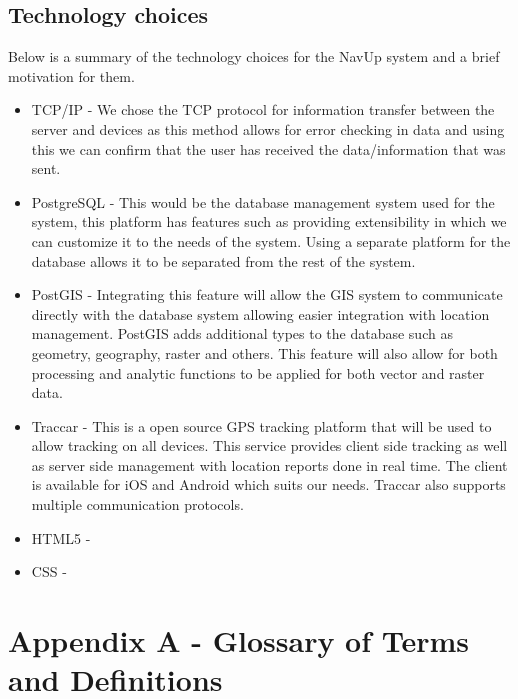 \documentclass{article}
\begin{document}
\subsection{Technology choices}
Below is a summary of the technology choices for the NavUp system and a brief motivation for them.
\begin{itemize}
  \item TCP/IP - We chose the TCP protocol for information transfer between the server and devices as this method allows for error checking in data and using this we can confirm that the user has received the data/information that was sent.
  \item PostgreSQL - This would be the database management system used for the system, this platform has features such as providing extensibility in which we can customize it to the needs of the system.  Using a separate platform for the database allows it to be separated from the rest of the system. 

\item PostGIS - Integrating this feature will allow the GIS system to communicate directly with the database system allowing easier integration with location management. PostGIS adds additional types to the database such as geometry, geography, raster and others. This feature will also allow for both processing and analytic functions to be applied for both vector and raster data.
\item Traccar - This is a open source GPS tracking platform that will be used to allow tracking on all devices. This service provides client side tracking as well as server side management with location reports done in real time. The client is available for iOS and Android which suits our needs. Traccar also supports multiple communication protocols. 
\item HTML5 - 
\item CSS - 
\end{itemize}
\newpage
\section{Appendix A - Glossary of Terms and Definitions}
\end{document}
